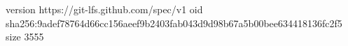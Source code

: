 version https://git-lfs.github.com/spec/v1
oid sha256:9adef78764d66cc156aeef9b2403fab043d9d98b67a5b00bee634418136fc2f5
size 3555
